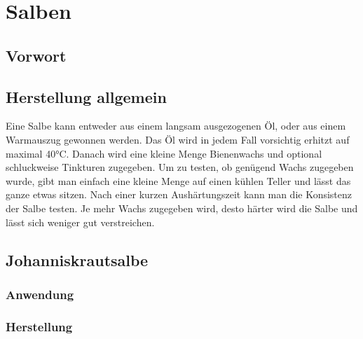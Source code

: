 \chapter{Salben}

\section{Vorwort}


\lipsum[1-2]




\section{Herstellung allgemein}

Eine Salbe kann entweder aus einem langsam ausgezogenen Öl, oder aus einem Warmauszug gewonnen werden. Das Öl wird in jedem Fall vorsichtig erhitzt auf maximal 40°C. Danach wird eine kleine Menge Bienenwachs und optional schluckweise Tinkturen zugegeben. Um zu testen, ob genügend Wachs zugegeben wurde, gibt man einfach eine kleine Menge auf einen kühlen Teller und lässt das ganze etwas sitzen. Nach einer kurzen Aushärtungszeit kann man die Konsistenz der Salbe testen. Je mehr Wachs zugegeben wird, desto härter wird die Salbe und lässt sich weniger gut verstreichen.


\newpage

\section{Johanniskrautsalbe}


     
               

\subsection{Anwendung}
\subsection{Herstellung}

